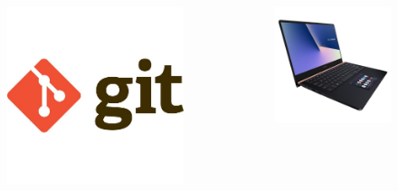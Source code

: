 \begin{frame}
\begin{columns}
\begin{figure}
\centering
\includegraphics[scale=0.10]{./images/git.jpeg}
\end{figure}

\pause

\begin{figure}
\centering
\includegraphics[scale=0.10]{./images/zenbook.jpeg}
\end{figure}

\end{columns}
\end{frame}